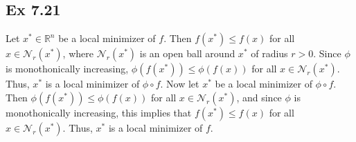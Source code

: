 \documentclass[letterpaper,12pt]{article}
\theoremstyle{definition}
\begin{document}
\begin{spacing}{1.3}{}
	\subsection*{Ex 7.21}
	Let $x^*\in\mathbb R^n$ be a local minimizer of $f$.
	Then $f(x^*)\leq f(x)$ for all $x\in\mathcal N_r(x^*)$,
	where $\mathcal N_r(x^*)$ is an open ball around $x^*$ of radius $r>0$.
	Since $\phi$ is monothonically increasing, $\phi(f(x^*))\leq\phi(f(x))$ for all $x\in\mathcal N_r(x^*)$.
	Thus, $x^*$ is a local minimizer of $\phi\circ f$.
	Now let $x^*$ be a local minimizer of $\phi\circ f$.
	Then $\phi(f(x^*))\leq\phi(f(x))$ for all $x\in\mathcal N_r(x^*)$,
	and since $\phi$ is monothonically increasing, this implies that
	$f(x^*)\leq f(x)$ for all $x\in\mathcal N_r(x^*)$.
	Thus, $x^*$ is a local minimizer of $f$.

\end{spacing}
\end{document}
